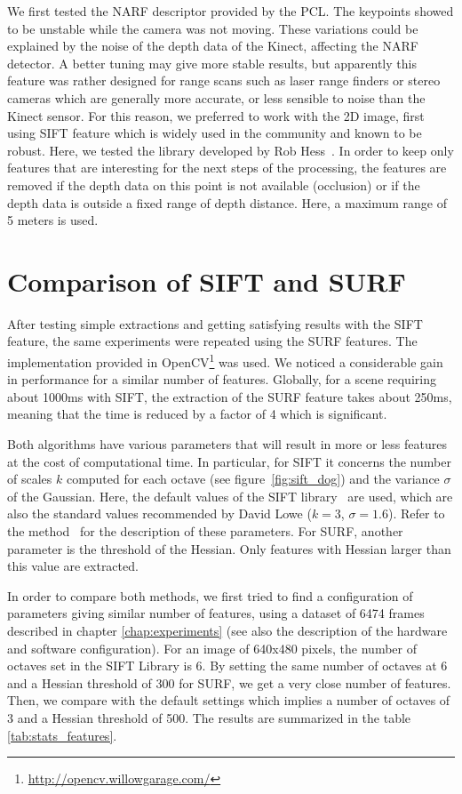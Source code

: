 We first tested the \gls{NARF} descriptor provided by the \gls{PCL}. The keypoints showed to be unstable while the camera was not moving. These variations could be explained by the noise of the depth data of the Kinect, affecting the \gls{NARF} detector. A better tuning may give more stable results, but apparently this feature was rather designed for range scans such as laser range finders or stereo cameras which are generally more accurate, or less sensible to noise than the Kinect sensor. For this reason, we preferred to work with the 2D image, first using \gls{SIFT} feature which is widely used in the community and known to be robust. Here, we tested the library developed by Rob Hess~\cite{hess_sift}. In order to keep only features that are interesting for the next steps of the processing, the features are removed if the depth data on this point is not available (occlusion) or if the depth data is outside a fixed range of depth distance. Here, a maximum range of 5 meters is used.

\clearpage
\section{Comparison of SIFT and SURF}
After testing simple extractions and getting satisfying results with the \gls{SIFT} feature, the same experiments were repeated using the \gls{SURF} features. The implementation provided in OpenCV\footnote{\url{http://opencv.willowgarage.com/}} was used. We noticed a considerable gain in performance for a similar number of features. Globally, for a scene requiring about 1000ms with \gls{SIFT}, the extraction of the \gls{SURF} feature takes about 250ms, meaning that the time is reduced by a factor of 4 which is significant.

Both algorithms have various parameters that will result in more or less features at the cost of computational time. In particular, for \gls{SIFT} it concerns the number of scales $k$ computed for each octave (see figure~\ref{fig:sift_dog}) and the variance $\sigma$ of the Gaussian. Here, the default values of the \gls{SIFT} library~\cite{hess_sift} are used, which are also the standard values recommended by David Lowe ($k=3$, $\sigma=1.6$). Refer to the method~\cite{lowe_2004_sift} for the description of these parameters. For \gls{SURF}, another parameter is the threshold of the Hessian. Only features with Hessian larger than this value are extracted.

In order to compare both methods, we first tried to find a configuration of parameters giving similar number of features, using a dataset of 6474 frames described in chapter \ref{chap:experiments} (see also the description of the hardware and software configuration). For an image of 640x480 pixels, the number of octaves set in the SIFT Library is 6. By setting the same number of octaves at 6 and a Hessian threshold of 300 for \gls{SURF}, we get a very close number of features. Then, we compare with the default settings which implies a number of octaves of 3 and a Hessian threshold of 500. The results are summarized in the table \ref{tab:stats_features}.

